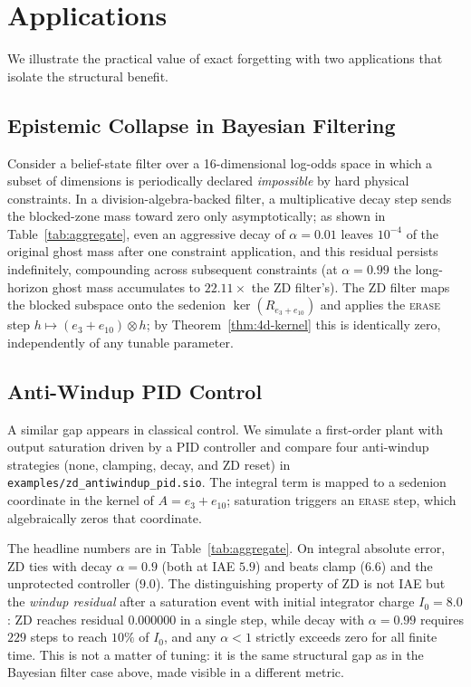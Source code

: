 \documentclass{article}
\begin{document}
\section{Applications}
\label{sec:applications}

We illustrate the practical value of exact forgetting with two applications
that isolate the structural benefit.

\subsection{Epistemic Collapse in Bayesian Filtering}
\label{sec:apps-bayes}

Consider a belief-state filter over a 16-dimensional log-odds space in which
a subset of dimensions is periodically declared \emph{impossible} by hard
physical constraints. In a division-algebra-backed filter, a multiplicative
decay step sends the blocked-zone mass toward zero only asymptotically; as
shown in Table~\ref{tab:aggregate}, even an aggressive decay of
$\alpha = 0.01$ leaves $10^{-4}$ of the original ghost mass after one
constraint application, and this residual persists indefinitely, compounding
across subsequent constraints (at $\alpha = 0.99$ the long-horizon ghost
mass accumulates to $22.11\times$ the ZD filter's). The ZD filter maps the
blocked subspace onto the sedenion $\ker(R_{e_3+e_{10}})$ and applies the
\textsc{erase} step $h \mapsto (e_3+e_{10}) \otimes h$; by
Theorem~\ref{thm:4d-kernel} this is identically zero, independently of any
tunable parameter.

\subsection{Anti-Windup PID Control}
\label{sec:apps-pid}

A similar gap appears in classical control. We simulate a first-order plant
with output saturation driven by a PID controller and compare four
anti-windup strategies (none, clamping, decay, and ZD reset) in
\texttt{examples/zd\_antiwindup\_pid.sio}. The integral term is mapped to a
sedenion coordinate in the kernel of $A = e_3 + e_{10}$; saturation triggers
an \textsc{erase} step, which algebraically zeros that coordinate.

The headline numbers are in Table~\ref{tab:aggregate}. On integral absolute
error, ZD ties with decay $\alpha = 0.9$ (both at IAE $5.9$) and beats clamp
($6.6$) and the unprotected controller ($9.0$). The distinguishing property
of ZD is not IAE but the \emph{windup residual} after a saturation event
with initial integrator charge $I_0 = 8.0$: ZD reaches residual $0.000000$
in a single step, while decay with $\alpha = 0.99$ requires $229$ steps to
reach $10\%$ of $I_0$, and any $\alpha < 1$ strictly exceeds zero for all
finite time. This is not a matter of tuning: it is the same structural gap
as in the Bayesian filter case above, made visible in a different metric.
\end{document}
